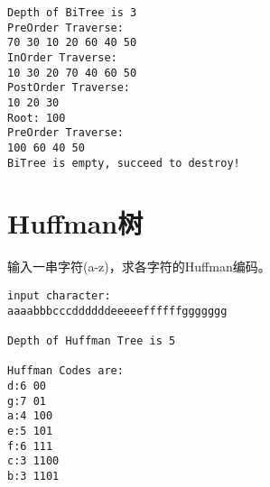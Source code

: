 \documentclass[10pt]{article}
\begin{document}

 

 

 

 

 

 



 
 



 
\begin{lstlisting}
Depth of BiTree is 3
PreOrder Traverse:
70 30 10 20 60 40 50 
InOrder Traverse:
10 30 20 70 40 60 50 
PostOrder Traverse:
10 20 30 
Root: 100
PreOrder Traverse:
100 60 40 50 
BiTree is empty, succeed to destroy!
\end{lstlisting}
 

\section{Huffman树}

\begin{li}
输入一串字符(a-z)，求各字符的Huffman编码。
\end{li}









\begin{lstlisting}[title=运行结果,frame=single]
input character:
aaaabbbcccddddddeeeeeffffffggggggg

Depth of Huffman Tree is 5

Huffman Codes are:
d:6 00
g:7 01
a:4 100
e:5 101
f:6 111
c:3 1100
b:3 1101
\end{lstlisting}
\end{document}
